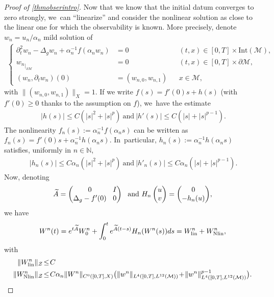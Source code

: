 \documentclass[JEP,XML,SOM,Unicode,published]{cedram}
\newcommand{\lin}{\textup{lin}}
\newcommand{\Nlin}{\textup{Nlin}}
\theoremstyle{definition}
\let\mc\mathcal
\newcommand{\M}{\mc{M}}
\newcommand{\N}{\mathbb{N}}
\providecommand{\norm}[1]{\lVert#1\rVert}
\begin{document}
\begin{proof}[Proof of \cref{thmobserintro}]
Now that we know that the initial datum converges to zero strongly, we~can ``linearize'' and consider the nonlinear solution as close to the linear one for which the observability is known. More precisely, denote $w_n=u_{n}/\alpha_n$ mild solution of
\begin{align*}
\left\{\begin{aligned}
\partial_t^2 w_n-\Delta_g w_n+\alpha_n^{-1}f(\alpha_n w_n)&=0 &&(t, x)\in [0, T]\times \text{Int}(\M),\\
{w_n}_{|_{\partial\M}}&=0 &&(t, x)\in [0, T]\times\partial\M,\\
(w_n, \partial_t w_n)(0)&=(w_{n,0}, w_{n,1})&&x\in \M,
\end{aligned}\right.
\end{align*}
with $\norm{(w_{n,0}, w_{n,1})}_{X}=1$. If we write $f(s)=f'(0)s+h(s)$ (with $f'(0)\geq 0$ thanks to the assumption on $f$), we~have the estimate
\begin{align*}
\ |h(s)|\leq C(|s|^2+|s|^p)\ \text{and}\ |h'(s)|\leq C(|s|+|s|^{p-1}).
\end{align*}
The nonlinearity $f_n(s):=\alpha_n^{-1}f(\alpha_n s)$ can be written as $f_n(s)=f'(0)s+\alpha_n^{-1}h(\alpha_n s)$. In~particular, $h_n(s):=\alpha_n^{-1}h(\alpha_n s)$ satisfies, uniformly in $n \in \N$,
\begin{align*}
\ |h_n(s)|\leq C\alpha_n(|s|^2+|s|^p)\ \text{and}\ |h'_n(s)|\leq C\alpha_n(|s|+|s|^{p-1}).
\end{align*}
Now, denoting
\begin{align*}\arraycolsep4.5pt
\widetilde A=\begin{pmatrix}
0 & I \\
\Delta_g -f'(0)& 0
\end{pmatrix}\ \text{ and }
H_n\begin{pmatrix}
u \\
v
\end{pmatrix}=\begin{pmatrix}
0 \\
-h_n(u)
\end{pmatrix}\!,
\end{align*}
we have
\begin{align*}
W^n(t)=e^{t\widetilde A}W_0^n+\int_0^t e^{\widetilde A(t-s)}H_n(W^n(s))ds=W_{\lin}^n+W_{\Nlin}^n,
\end{align*}
with
\begin{align}
\norm{W_{\lin}^n}_{\mc{Z}}&\!\leq\! C\\
\label{estimWNlin}\norm{W_{\Nlin}^n}_{\mc{Z}}&\!\leq\! C\alpha_n \norm{W^n}_{C^0([0, T],X)}\big(\norm{w^n}_{L^{4}([0, T],L^{12}(\M))}\!+\!\norm{w^n}_{L^{4}([0, T],L^{12}(\M))}^{p-1}\big).

\end{align}
\end{proof}
\end{document}
